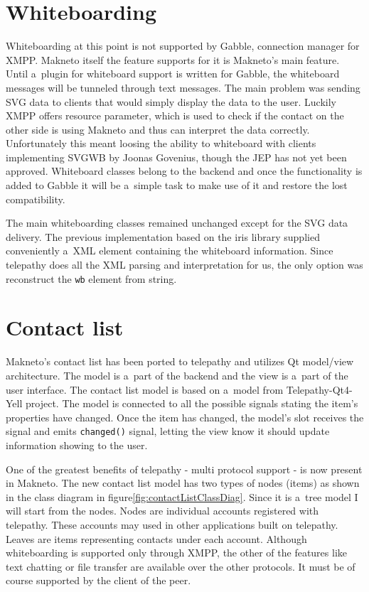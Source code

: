 \section{Whiteboarding}
Whiteboarding at this point is not supported by Gabble, connection manager for XMPP. Makneto itself the feature supports for it is Makneto's main feature. Until a~plugin for whiteboard support is written for Gabble, the whiteboard messages will be tunneled through text messages. The main problem was sending SVG data to clients that would simply display the data to the user. Luckily XMPP offers resource parameter, which is used to check if the contact on the other side is using Makneto and thus can interpret the data correctly. Unfortunately this meant loosing the ability to whiteboard with clients implementing SVGWB by Joonas Govenius, though the JEP has not yet been approved. Whiteboard classes belong to the backend and once the functionality is added to Gabble it will be a~simple task to make use of it and restore the lost compatibility. 

The main whiteboarding classes remained unchanged except for the SVG data delivery. The previous implementation based on the iris library supplied conveniently a~XML element containing the whiteboard information. Since telepathy does all the XML parsing and interpretation for us, the only option was reconstruct the \verb|wb| element from string.  

\section{Contact list}\label{section:contactList}
Makneto's contact list has been ported to telepathy and utilizes Qt model/view architecture. The model is a~part of the backend and the view is a~part of the user interface. The contact list model is based on a~model from Telepathy-Qt4-Yell project\cite{telepathy-qt4-yell}. The model is connected to all the possible signals stating the item's properties have changed. Once the item has changed, the model's slot receives the signal and emits \verb|changed()| signal, letting the view know it should update information showing to the user.   

One of the greatest benefits of telepathy - multi protocol support - is now present in Makneto. The new contact list model has two types of nodes (items) as shown in the class diagram in figure\ref{fig:contactListClassDiag}. Since it is a~tree model I will start from the nodes. Nodes are individual accounts registered with telepathy. These accounts may used in other applications built on telepathy. Leaves are items representing contacts under each account. Although whiteboarding is supported only through XMPP, the other of the features like text chatting or file transfer are available over the other protocols. It must be of course supported by the client of the peer.

